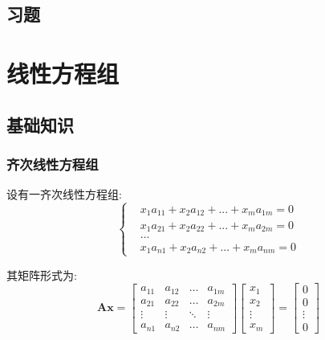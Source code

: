\section{习题}
\chapter{线性方程组}
\section{基础知识}
\subsection{齐次线性方程组}
设有一齐次线性方程组:
\begin{equation*}
\left\{\begin{aligned}
       & x_{1}a_{11}+x_{2}a_{12}+...+x_{m}a_{1m}=0 \\
       & x_{1}a_{21}+x_{2}a_{22}+...+x_{m}a_{2m}=0 \\
       & \dots \\
       & x_{1}a_{n1}+x_{2}a_{n2}+...+x_{m}a_{nm}=0
\end{aligned}
\right.
\end{equation*}\par
其矩阵形式为:
\begin{equation*}
\bm{A}\bm{x}=\begin{bmatrix}
             a_{11} & a_{12} & \dots & a_{1m} \\
             a_{21} & a_{22} & \dots & a_{2m} \\
             \vdots & \vdots & \ddots & \vdots \\
             a_{n1} & a_{n2} & \dots & a_{nm}
\end{bmatrix}
\begin{bmatrix}
x_{1} \\
x_{2} \\
\vdots \\
x_{m}
\end{bmatrix}=
\begin{bmatrix}
0 \\
0 \\
\vdots \\
0
\end{bmatrix}
\end{equation*}
